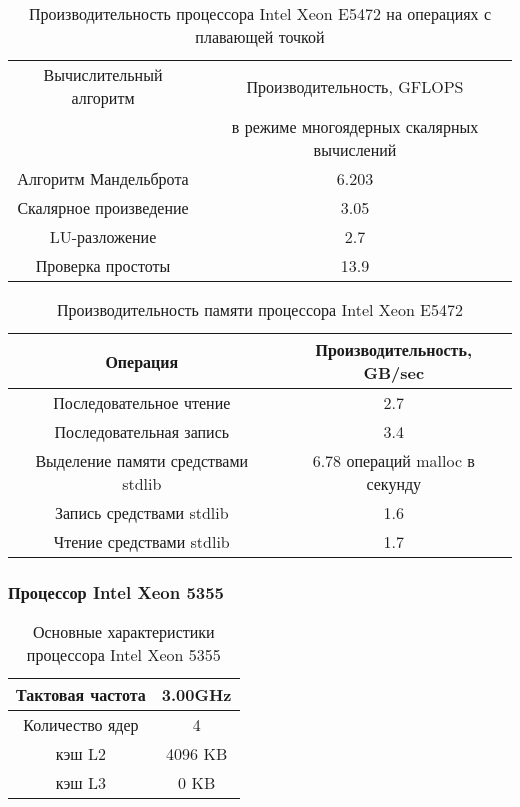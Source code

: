 \begin{table}[ht]
	\begin{center}
		\caption{Производительность процессора Intel Xeon  E5472 на операциях с плавающей точкой}
		\begin{tabular}{|c|c|}
			\hline	
			Вычислительный алгоритм &  Производительность, GFLOPS \\ 
			& в режиме многоядерных скалярных вычислений \\ \hline
			Алгоритм Мандельброта  &  6.203 	\\ \hline
			Скалярное произведение &  3.05   \\ \hline
			LU-разложение          &  2.7   \\ \hline
			Проверка простоты      &  13.9  \\ \hline 
			
			
		\end{tabular}
	\end{center} 	
\end{table} 	

\begin{table}[ht]
	\begin{center}
		\caption{Производительность памяти процессора Intel Xeon E5472}
		\begin{tabular}{|c|c|}
			\hline	
			Операция  &  Производительность, GB/sec \\ \hline
			Последовательное чтение &  2.7 	\\  \hline
			Последовательная запись &  3.4   \\  \hline
			Выделение памяти средствами stdlib &  6.78 операций malloc в секунду  \\  \hline
			Запись средствами stdlib  & 1.6  \\ \hline
			Чтение средствами stdlib  & 1.7  \\ \hline 
		\end{tabular}
	\end{center} 	
\end{table} 	



\subsubsection{Процессор Intel Xeon 5355}

\begin{table}[ht]
	\begin{center}
		\caption{Основные характеристики процессора Intel Xeon  5355}
		\begin{tabular}{|c|c|}
			\hline	
			Тактовая частота & 3.00GHz   \\ \hline
			Количество ядер & 4 	     \\ \hline
			кэш L2         &  4096 KB      \\ \hline
			кэш L3         &  0 KB        \\ \hline
		\end{tabular}
	\end{center} 	
\end{table} 	

